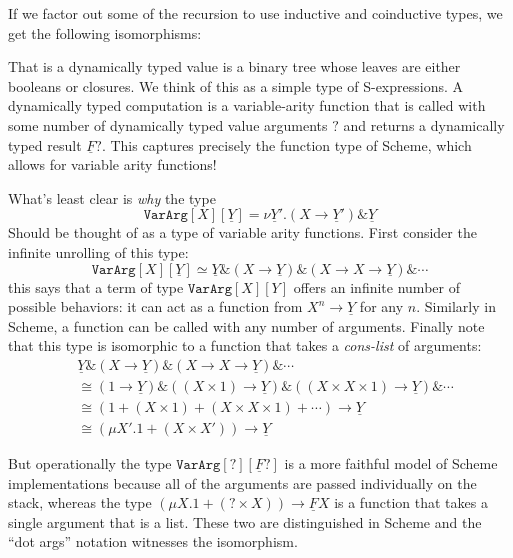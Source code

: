 \documentclass[acmsmall,screen,12pt]{acmart}
\renewcommand{\u}{\underline}
\newcommand{\dynv}{{?}}
\newcommand{\dync}{\u {\text{?`}}}
\newcommand{\with}{\mathbin{\&}}
\begin{document}
\begin{longonly}
If we factor out some of the recursion to use inductive and
coinductive types, we get the following isomorphisms:

That is a dynamically typed value is a binary tree whose leaves are
either booleans or closures.
%
We think of this as a simple type of S-expressions.
%
A dynamically typed computation is a variable-arity function that is
called with some number of dynamically typed value arguments $\dynv$
and returns a dynamically typed result $\u F \dynv$.
%
This captures precisely the function type of Scheme, which allows for
variable arity functions!

What's least clear is \emph{why} the type
\[
\texttt{VarArg}[X][\u Y] = \nu \u Y'. (X \to \u Y') \with \u Y
\]
Should be thought of as a type of variable arity functions.
%
First consider the infinite unrolling of this type:
\[
\texttt{VarArg}[X][\u Y] \simeq \u Y \with (X \to \u Y) \with (X \to X \to \u Y) \with \cdots
\]
this says that a term of type $\texttt{VarArg}[X][Y]$ offers an
infinite number of possible behaviors: it can act as a function from
$X^n \to \u Y$ for any $n$.
%
Similarly in Scheme, a function can be called with any number of
arguments.
%
Finally note that this type is isomorphic to a function that takes a
\emph{cons-list} of arguments:
\begin{align*}
  &\u Y \with (X \to \u Y) \with (X \to X \to \u Y) \with \cdots\\
  &\cong(1 \to \u Y) \with ((X \times 1) \to \u Y) \with ((X \times X \times 1) \to \u Y) \with \cdots\\
  &\cong(1 + (X \times 1) + (X \times X \times 1) + \cdots) \to \u Y\\
  &\cong(\mu X'. 1 + (X\times X')) \to \u Y
\end{align*}

But operationally the type $\texttt{VarArg}[\dynv][\u F\dynv]$ is a
more faithful model of Scheme implementations because all of the
arguments are passed individually on the stack, whereas the type $(\mu
X. 1 + (\dynv \times X)) \to \u F X$ is a function that takes a single
argument that is a list.
%
These two are distinguished in Scheme and the ``dot args'' notation
witnesses the isomorphism.
\end{longonly}
\end{document}
